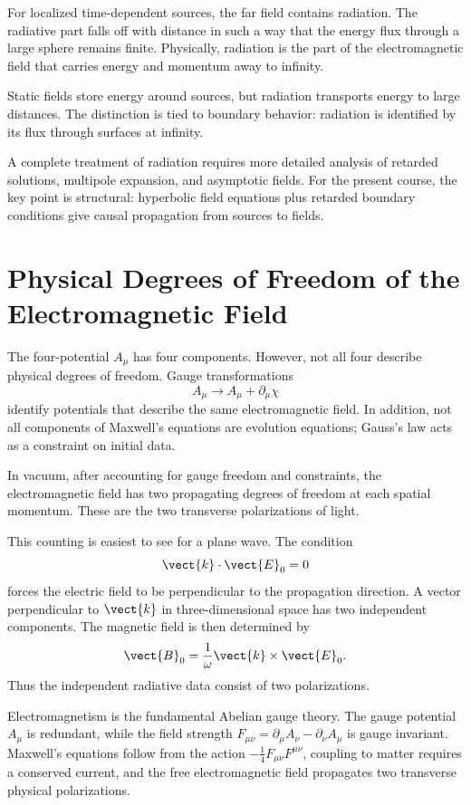 For localized time-dependent sources, the far field contains radiation. The
radiative part falls off with distance in such a way that the energy flux
through a large sphere remains finite. Physically, radiation is the part of the
electromagnetic field that carries energy and momentum away to infinity.

\begin{remarkbox}
Static fields store energy around sources, but radiation transports energy to
large distances. The distinction is tied to boundary behavior: radiation is
identified by its flux through surfaces at infinity.
\end{remarkbox}

A complete treatment of radiation requires more detailed analysis of retarded
solutions, multipole expansion, and asymptotic fields. For the present course,
the key point is structural: hyperbolic field equations plus retarded boundary
conditions give causal propagation from sources to fields.

\section{Physical Degrees of Freedom of the Electromagnetic Field}

The four-potential \(A_\mu\) has four components. However, not all four describe
physical degrees of freedom. Gauge transformations
\[
    A_\mu\longrightarrow A_\mu+\partial_\mu\chi
\]
identify potentials that describe the same electromagnetic field. In addition,
not all components of Maxwell's equations are evolution equations; Gauss's law
acts as a constraint on initial data.

In vacuum, after accounting for gauge freedom and constraints, the electromagnetic
field has two propagating degrees of freedom at each spatial momentum. These are
the two transverse polarizations of light.

This counting is easiest to see for a plane wave. The condition
\[
    \vect{k}\cdot\vect{E}_0=0
\]
forces the electric field to be perpendicular to the propagation direction. A
vector perpendicular to \(\vect{k}\) in three-dimensional space has two
independent components. The magnetic field is then determined by
\[
    \vect{B}_0=\frac{1}{\omega}\vect{k}\times\vect{E}_0.
\]
Thus the independent radiative data consist of two polarizations.

\begin{summarybox}
Electromagnetism is the fundamental Abelian gauge theory. The gauge potential
\(A_\mu\) is redundant, while the field strength
\(F_{\mu\nu}=\partial_\mu A_\nu-\partial_\nu A_\mu\) is gauge invariant. Maxwell's
equations follow from the action \(-\frac{1}{4}F_{\mu\nu}F^{\mu\nu}\), coupling to
matter requires a conserved current, and the free electromagnetic field
propagates two transverse physical polarizations.
\end{summarybox}
